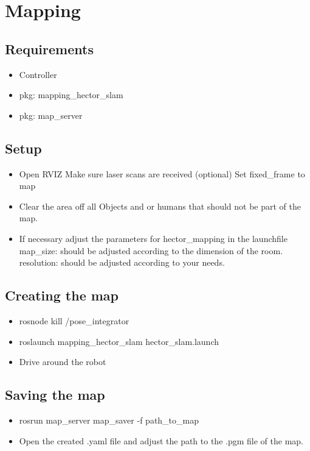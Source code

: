 \documentclass[main.tex]{subfiles}
\begin{document}
	\chapter{Mapping}
	
	\section{Requirements}
	\begin{itemize}
		\item Controller
		\item pkg: mapping\_hector\_slam
		\item pkg: map\_server
	\end{itemize}
	
	\section{Setup}
	\begin{itemize}
		\item Open RVIZ
		\subitem Make sure laser scans are received
		\subitem (optional) Set fixed\_frame to map
		\item Clear the area off all Objects and or humans that should not be part of the map.
		\item If necessary adjust the parameters for hector\_mapping in the launchfile 
		\subitem map\_size: should be adjusted according to the dimension of the room.
		\subitem resolution: should be adjusted according to your needs. 
	\end{itemize}
	
	\section{Creating the map}
	\begin{itemize}
		\item rosnode kill /pose\_integrator
		\item roslaunch mapping\_hector\_slam hector\_slam.launch
		\item Drive around the robot
	\end{itemize}
	
	\section{Saving the map}
	\begin{itemize}
		\item rosrun map\_server map\_saver -f path\_to\_map
		\item Open the created .yaml file and adjust the path to the .pgm file of the map.
	\end{itemize}
	
\end{document}
